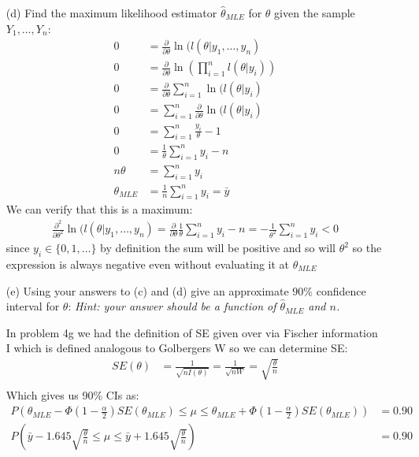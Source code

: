 \documentclass{article}
\newcommand{\1}{\mathbf{1}}
\begin{document}
\begin{itemize}
    \item[(d)]  Find the maximum likelihood estimator $\hat{\theta}_{MLE}$ for $\theta$ given the sample $Y_1,\ldots, Y_n$:
    \begin{align*}
        0 &= \frac{\partial}{\partial\theta} \ln(l(\theta|y_1,\hdots ,y_n) \\
        0 &= \frac{\partial}{\partial\theta} \ln\left( \prod_{i=1}^n l(\theta|y_i) \right) \\
        0 &= \frac{\partial}{\partial\theta} \sum_{i=1}^n \ln(l(\theta|y_i) \\
        0 &= \sum_{i=1}^n \frac{\partial}{\partial\theta} \ln(l(\theta|y_i) \\
        0 &= \sum_{i=1}^n \frac{y_i}{\theta} -1 \\
        0 &= \frac{1}{\theta} \sum_{i=1}^n y_i - n \\
        n\theta  &= \sum_{i=1}^n y_i \\
        \theta_{MLE} &= \frac{1}{n} \sum_{i=1}^n y_i = \bar y 
    \end{align*}
    We can verify that this is a maximum:
    \begin{align*}
        \frac{\partial^2}{\partial\theta^2} \ln(l(\theta|y_1,\hdots ,y_n) =   \frac{\partial}{\partial\theta} \frac{1}{\theta} \sum_{i=1}^n y_i - n = -\frac{1}{\theta^2} \sum_{i=1}^n y_i < 0
    \end{align*}
    since $y_i \in \{0,1,\ldots \}$ by definition the sum will be positive and so will $\theta^2$ so the expression is always negative even without evaluating it at $\theta_{MLE}$

    \item[(e)]  Using your answers to (c) and (d) give an approximate $90\%$ confidence interval for $\theta$: {\it Hint: your answer should be a function of $\hat{\theta}_{MLE}$ and $n$.}
    
    In problem 4g we had the definition of SE given over via Fischer information I which is defined analogous to Golbergers W so we can determine SE:
    \begin{align*}
        SE(\theta) &= \frac{1}{\sqrt{nI(\theta)}} = \frac{1}{\sqrt{nW}} = \sqrt{\frac{\theta}{n}}\\
    \end{align*}
    Which gives us 90\% CIs as:
    \begin{align*}
        P\left(\theta_{MLE} - \Phi\left(1-\frac{\alpha}{2}\right)SE(\theta_{MLE}) \leq \mu \leq \theta_{MLE} + \Phi\left(1-\frac{\alpha}{2}\right)SE(\theta_{MLE})\right) &= 0.90 \\
        P\left(\bar y - 1.645  \sqrt{\frac{\theta}{n}} \leq \mu \leq \bar y + 1.645 \sqrt{\frac{\theta}{n}}\right) &= 0.90
    \end{align*} 
\end{itemize}
\end{document}

